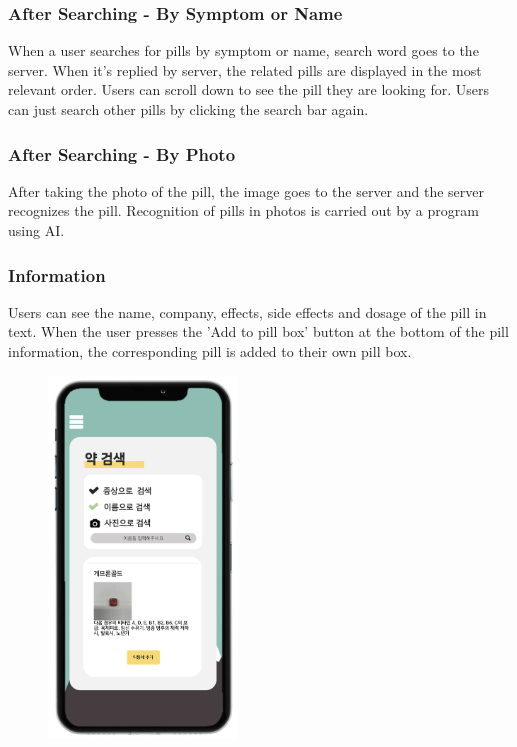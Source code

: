 \documentclass[conference]{IEEEtran}
\begin{document}
\subsubsection{After Searching - By Symptom or Name}
When a user searches for pills by symptom or name, search word goes to the server. When it's replied by server, the related pills are displayed in the most relevant order. Users can scroll down to see the pill they are looking for. Users can just search other pills by clicking the search bar again.\\ 

\subsubsection{After Searching - By Photo}
After taking the photo of the pill, the image goes to the server and the server recognizes the pill. Recognition of pills in photos is carried out by a program using AI.\\

\subsubsection{Information}
Users can see the name, company, effects, side effects and dosage of the pill in text. When the user presses the 'Add to pill box' button at the bottom of the pill information, the corresponding pill is added to their own pill box.\\ 

\begin{figure}[h!]
\centering
\includegraphics[width=5cm]{final_image_folder/search_result.png}
\caption{}
\label{fig:map}
\end{figure}
\end{document}
